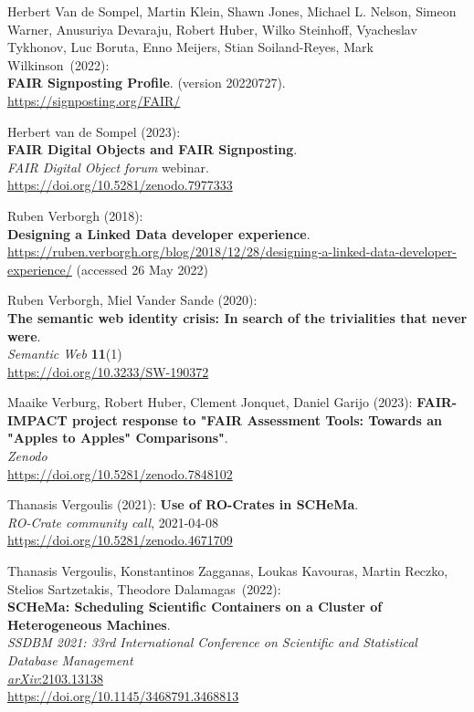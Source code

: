 \begin{thebibliography}{9}
Herbert Van de Sompel, Martin Klein, Shawn
Jones, Michael L. Nelson, Simeon Warner, Anusuriya Devaraju, Robert
Huber, Wilko Steinhoff, Vyacheslav Tykhonov, Luc Boruta, Enno Meijers,
Stian Soiland-Reyes, Mark Wilkinson~(2022):\\
\textbf{FAIR Signposting Profile}. (version 20220727).\\
\url{https://signposting.org/FAIR/}

Herbert van de Sompel (2023):\\
\textbf{FAIR Digital Objects and FAIR Signposting}.\\
\emph{FAIR Digital Object forum} webinar.\\
\url{https://doi.org/10.5281/zenodo.7977333}

Ruben Verborgh (2018): \\
\textbf{Designing a {Linked Data} developer experience}.\\
\url{https://ruben.verborgh.org/blog/2018/12/28/designing-a-linked-data-developer-experience/}
(accessed 26 May 2022)

Ruben Verborgh, Miel Vander Sande (2020): \\
\textbf{The semantic web identity crisis: In search of the trivialities that never were}.\\
\emph{Semantic Web} \textbf{11}(1)\\
\url{https://doi.org/10.3233/SW-190372}

Maaike Verburg, Robert Huber, Clement Jonquet, Daniel Garijo (2023):
\textbf{{FAIR-IMPACT project response to "FAIR Assessment Tools: Towards
an "Apples to Apples" Comparisons"}}.\\
\emph{Zenodo}\\
\url{https://doi.org/10.5281/zenodo.7848102}

Thanasis Vergoulis (2021):  
\textbf{Use of RO-Crates in SCHeMa}.\\
\emph{RO-Crate community call}, 2021-04-08\\
\url{https://doi.org/10.5281/zenodo.4671709}

Thanasis Vergoulis, Konstantinos Zagganas, Loukas Kavouras, Martin Reczko, Stelios Sartzetakis, Theodore Dalamagas~(2022):\\
\textbf{SCHeMa: Scheduling Scientific Containers on a Cluster of
Heterogeneous Machines}.\\
\emph{SSDBM 2021: 33rd International Conference on Scientific and Statistical Database Management}\\
\href{https://doi.org/10.48550/arXiv.2103.13138}{\emph{arXiv}:2103.13138}\\
\url{https://doi.org/10.1145/3468791.3468813}


\end{thebibliography}
